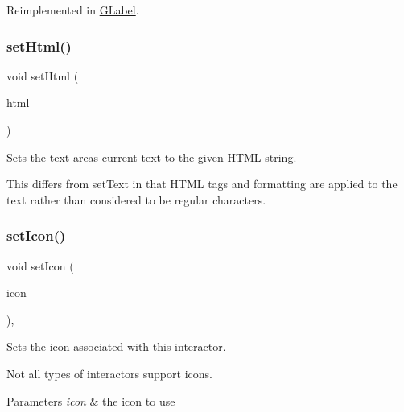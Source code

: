 Reimplemented in \mbox{\hyperlink{classsgl_1_1GLabel_a5eead864d1249c4406f32f9944ed1503}{G\+Label}}.

\mbox{\label{classsgl_1_1GTextArea_a71ca94fd0ab4223097c4d524ddafe94f}} 
\subsubsection{\texorpdfstring{set\+Html()}{setHtml()}}
{\footnotesize\ttfamily void set\+Html (\begin{DoxyParamCaption}\item[{const std\+::string \&}]{html }\end{DoxyParamCaption})\hspace{0.3cm}{\ttfamily [virtual]}}



Sets the text area\textquotesingle{}s current text to the given H\+T\+ML string. 

This differs from set\+Text in that H\+T\+ML tags and formatting are applied to the text rather than considered to be regular characters. \mbox{\label{classsgl_1_1GInteractor_a542abfcd7261751352af129c7215ecda}} 
\subsubsection{\texorpdfstring{set\+Icon()}{setIcon()}\hspace{0.1cm}{\footnotesize\ttfamily [1/3]}}
{\footnotesize\ttfamily void set\+Icon (\begin{DoxyParamCaption}\item[{const Q\+Icon \&}]{icon }\end{DoxyParamCaption})\hspace{0.3cm}{\ttfamily [virtual]}, {\ttfamily [inherited]}}



Sets the icon associated with this interactor. 

Not all types of interactors support icons. 
\begin{DoxyParams}{Parameters}
{\em icon} & the icon to use \\
\hline
\end{DoxyParams}


